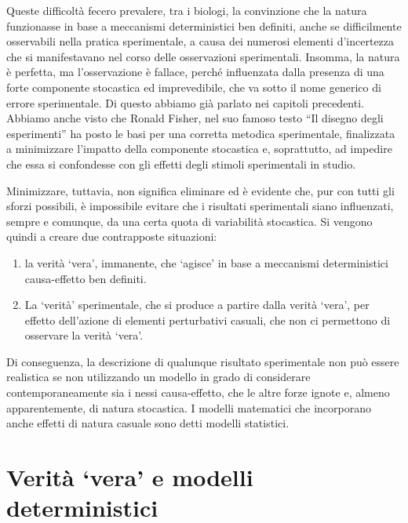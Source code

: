 \documentclass[a4paper,12pt,oneside]{book}
\providecommand{\tightlist}{%
  \setlength{\itemsep}{0pt}\setlength{\parskip}{0pt}}
\begin{document}
Queste difficoltà fecero prevalere, tra i biologi, la convinzione che la natura funzionasse in base a meccanismi deterministici ben definiti, anche se difficilmente osservabili nella pratica sperimentale, a causa dei numerosi elementi d'incertezza che si manifestavano nel corso delle osservazioni sperimentali. Insomma, la natura è perfetta, ma l'osservazione è fallace, perché influenzata dalla presenza di una forte componente stocastica ed imprevedibile, che va sotto il nome generico di errore sperimentale. Di questo abbiamo già parlato nei capitoli precedenti. Abbiamo anche visto che Ronald Fisher, nel suo famoso testo ``Il disegno degli esperimenti'' ha posto le basi per una corretta metodica sperimentale, finalizzata a minimizzare l'impatto della componente stocastica e, soprattutto, ad impedire che essa si confondesse con gli effetti degli stimoli sperimentali in studio.

Minimizzare, tuttavia, non significa eliminare ed è evidente che, pur con tutti gli sforzi possibili, è impossibile evitare che i risultati sperimentali siano influenzati, sempre e comunque, da una certa quota di variabilità stocastica. Si vengono quindi a creare due contrapposte situazioni:

\begin{enumerate}
\def\labelenumi{\arabic{enumi}.}
\tightlist
\item
  la verità `vera', immanente, che `agisce' in base a meccanismi deterministici causa-effetto ben definiti.
\item
  La `verità' sperimentale, che si produce a partire dalla verità `vera', per effetto dell'azione di elementi perturbativi casuali, che non ci permettono di osservare la verità `vera'.
\end{enumerate}

Di conseguenza, la descrizione di qualunque risultato sperimentale non può essere realistica se non utilizzando un modello in grado di considerare contemporaneamente sia i nessi causa-effetto, che le altre forze ignote e, almeno apparentemente, di natura stocastica. I modelli matematici che incorporano anche effetti di natura casuale sono detti modelli statistici.

\hypertarget{verituxe0-vera-e-modelli-deterministici}{%
\section{Verità `vera' e modelli deterministici}\label{verituxe0-vera-e-modelli-deterministici}}
\end{document}
